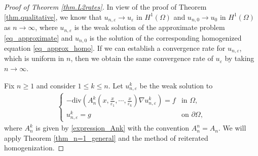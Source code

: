 \documentclass[reqno,12pt]{amsart} %
\theoremstyle{definition}
\theoremstyle{remark}
\numberwithin{equation}{section}
\newcommand{\e}{\varepsilon}
\begin{document}
\begin{proof}[Proof of Theorem \ref{thm.L2rates}]
In view of the proof of Theorem \ref{thm.qualitative}, we know that $u_{n,\e} \to u_\e$ in $H^1(\Omega)$ and $u_{n,0} \to u_0$ in $H^1(\Omega)$ as $n\to \infty$, where $u_{n,\e}$ is the weak solution of the approximate problem \eqref{eq_approximate} and $u_{n,0}$ is the solution of the corresponding homogenized equation \eqref{eq_approx_homo}. If we can establish a convergence rate for $u_{n,\e}$, which is uniform in $n$, then we obtain the same convergence rate of $u_\e$ by taking $n\to \infty$.

Fix $n \ge 1$ and consider $1\leq k\leq n$. Let $u_{n, \varepsilon}^{k}$ be the weak solution to
  \begin{align*}
    \begin{cases}
      -\mathrm{div}(A_n^{k}(x, \frac{x}{\varepsilon_1}, \cdots, \frac{x}{\varepsilon_{k}})\nabla u_{n, \varepsilon}^{k})=f&\text{in }\Omega,\\
      u_{n, \varepsilon}^{k}=g &\text{on }\partial\Omega,
    \end{cases}
  \end{align*}
  where $A_n^{k}$ is given by \eqref{expression_Ank} with the convention $A_n^n = A_n$. %
  We will apply Theorem \ref{thm_n=1_general} and the method of reiterated homogenization. 
  

\end{proof}
\end{document}
